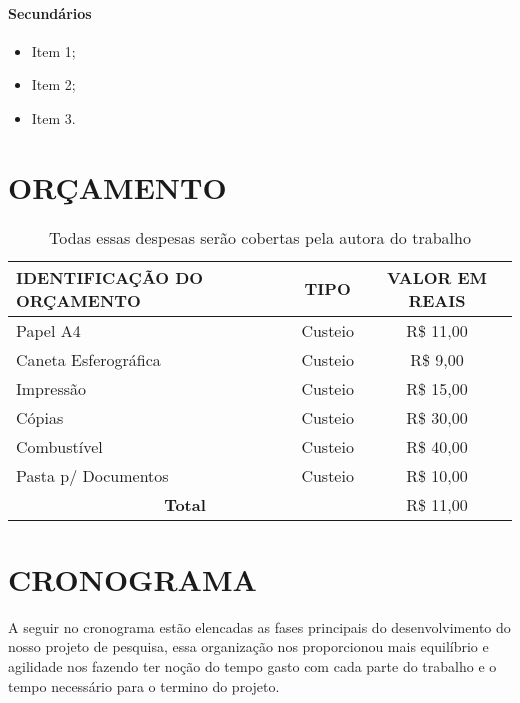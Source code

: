\documentclass[
	12pt,				%
	a4paper,			%
    openany,
    oneside,
	english,			%
	french,				%
	spanish,			%
	brazil,				%
	]{abntex2}
\begin{document}
\subsubsection{Secundários}

\begin{itemize}
\item Item 1;
\item Item 2;
\item Item 3.
\end{itemize}

\chapter{ORÇAMENTO}

\begin{table}[!ht]
\begin{center}
\begin{tabular}{|l|c|c|}
	\hline
	IDENTIFICAÇÃO DO ORÇAMENTO & TIPO & VALOR EM REAIS\\
	\hline
    Papel A4 & Custeio & R\$ 11,00\\
    \hline
    Caneta Esferográfica & Custeio & R\$ 9,00\\
    \hline
    Impressão & Custeio & R\$ 15,00\\
    \hline
    Cópias & Custeio & R\$ 30,00\\
    \hline
    Combustível & Custeio & R\$ 40,00\\
    \hline
    Pasta p/ Documentos & Custeio & R\$ 10,00\\
    \hline
    \multicolumn{2}{|c|}{\textbf{Total}} & R\$ 11,00\\
    \hline
\end{tabular}
\caption{\label{tab:Orçamento}Todas essas despesas serão cobertas pela autora do trabalho}
\end{center}
\end{table}

\chapter{CRONOGRAMA}

A seguir no cronograma estão elencadas as fases principais do desenvolvimento do nosso projeto de pesquisa, essa organização nos proporcionou mais equilíbrio e agilidade nos fazendo ter noção do tempo gasto com cada parte do trabalho e o tempo necessário para o termino do projeto.
\end{document}
